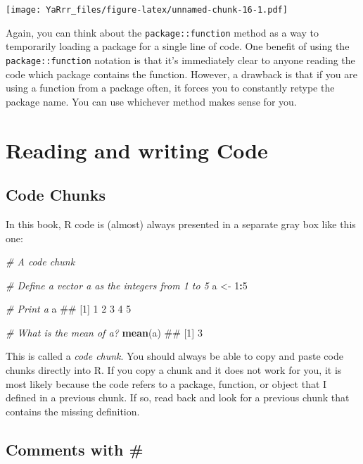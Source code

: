 \documentclass[]{book}
\newenvironment{Shaded}{\begin{snugshade}}{\end{snugshade}}
\newcommand{\KeywordTok}[1]{\textcolor[rgb]{0.13,0.29,0.53}{\textbf{#1}}}
\newcommand{\DecValTok}[1]{\textcolor[rgb]{0.00,0.00,0.81}{#1}}
\newcommand{\StringTok}[1]{\textcolor[rgb]{0.31,0.60,0.02}{#1}}
\newcommand{\CommentTok}[1]{\textcolor[rgb]{0.56,0.35,0.01}{\textit{#1}}}
\newcommand{\OperatorTok}[1]{\textcolor[rgb]{0.81,0.36,0.00}{\textbf{#1}}}
\newcommand{\NormalTok}[1]{#1}
\theoremstyle{definition}
\theoremstyle{definition}
\theoremstyle{remark}
\begin{document}
\texttt{[image: YaRrr\_files/figure-latex/unnamed-chunk-16-1.pdf]}

Again, you can think about the \texttt{package::function} method as a
way to temporarily loading a package for a single line of code. One
benefit of using the \texttt{package::function} notation is that it's
immediately clear to anyone reading the code which package contains the
function. However, a drawback is that if you are using a function from a
package often, it forces you to constantly retype the package name. You
can use whichever method makes sense for you.

\section{Reading and writing Code}\label{reading-and-writing-code}

\subsection{Code Chunks}\label{code-chunks}

In this book, R code is (almost) always presented in a separate gray box
like this one:

\begin{Shaded}
\begin{Highlighting}[]
\CommentTok{# A code chunk}

\CommentTok{# Define a vector a as the integers from 1 to 5}
\NormalTok{a <-}\StringTok{ }\DecValTok{1}\OperatorTok{:}\DecValTok{5}

\CommentTok{# Print a}
\NormalTok{a}
\NormalTok{## [1] 1 2 3 4 5}

\CommentTok{# What is the mean of a?}
\KeywordTok{mean}\NormalTok{(a)}
\NormalTok{## [1] 3}
\end{Highlighting}
\end{Shaded}

This is called a \emph{code chunk}. You should always be able to copy
and paste code chunks directly into R. If you copy a chunk and it does
not work for you, it is most likely because the code refers to a
package, function, or object that I defined in a previous chunk. If so,
read back and look for a previous chunk that contains the missing
definition.

\subsection{Comments with \#}\label{comments-with}
\end{document}
